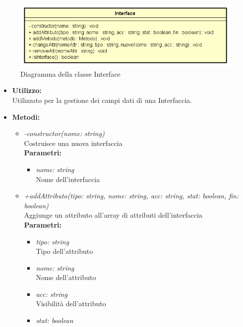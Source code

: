 \begin{figure}[h!]
	\centering
	\includegraphics[scale=0.8]{res/sections/SpecificaFrontEnd/Services/Disegnetti/interface.png}
	\caption{Diagramma della classe Interface}
\end{figure}

\begin{itemize}
	item \textbf{Descrizione:}\\
	Modello che contiene tutti i metodi per la gestione dei campi dati di una Interfaccia.
	\item \textbf{Utilizzo:}\\
	Utilizzato per  la gestione dei campi dati di una Interfaccia.
	\item \textbf{Metodi:}
		\begin{itemize}
			\item \emph{-constructor(nome: string)}\\
    		Costruisce una nuova interfaccia\\
    		\textbf{Parametri:}
    		\begin{itemize}
    			\item \emph{nome: string}\\
    			Nome dell'interfaccia
    		\end{itemize}
    		\item \emph{+addAttributo(tipo: string, nome: string, acc: string, stat: boolean, fin: boolean)}\\
    		Aggiunge un attributo all'array di attributi dell'interfaccia\\
    		\textbf{Parametri:}
    		\begin{itemize}
    			\item \emph{tipo: string}\\
    			Tipo dell'attributo
    			\item \emph{nome: string}\\
    			Nome dell'attributo
    			\item \emph{acc: string}\\
    			Visibilità dell'attributo
    			\item \emph{stat: boolean}\\

\end{itemize}
\end{itemize}
\end{itemize}
